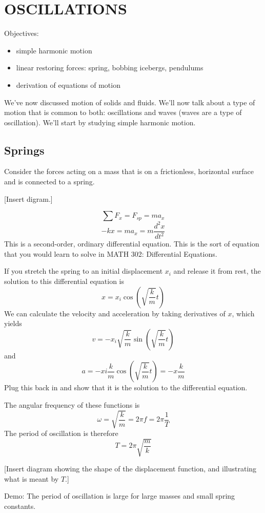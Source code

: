 \section{OSCILLATIONS}
Objectives:
\begin{itemize}
\item simple harmonic motion
\item linear restoring forces: spring, bobbing icebergs, pendulums
\item derivation of equations of motion
\end{itemize}

\hrulefill

We've now discussed motion of solids and fluids. We'll now talk about a type of motion that is common to both: oscillations and waves (waves are a type of oscillation). We'll start by studying simple harmonic motion.

\subsection{Springs}
Consider the forces acting on a mass that is on a frictionless, horizontal surface and is connected to a spring.

[Insert digram.]
\vspace{5cm}

$$\sum F_x = F_{sp}=ma_x$$
$$-kx=ma_x=m\frac{d^2x}{dt^2}$$
This is a second-order, ordinary differential equation. This is the sort of equation that you would learn to solve in MATH 302: Differential Equations.

If you stretch the spring to an initial displacement $x_i$ and release it from rest, the solution to this differential equation is
$$x=x_i\cos\left(\sqrt{\frac{k}{m}}t\right)$$
We can calculate the velocity and acceleration by taking derivatives of $x$, which yields
$$v=-x_i\sqrt{\frac{k}{m}}\sin\left(\sqrt{\frac{k}{m}}t\right)$$
and
$$a=-xi\frac{k}{m}\cos\left(\sqrt{\frac{k}{m}}t\right)=-x\frac{k}{m}$$
Plug this back in and show that it is the solution to the differential equation.


The angular frequency of these functions is
$$\omega=\sqrt{\frac{k}{m}}=2\pi f=2\pi\frac{1}{T}$$
The period of oscillation is therefore 
$$\boxed{T=2\pi\sqrt{\frac{m}{k}}}$$

[Insert diagram showing the shape of the displacement function, and illustrating what is meant by $T$.]
\vspace{5cm}

Demo: The period of oscillation is large for large masses and small spring constants. 

